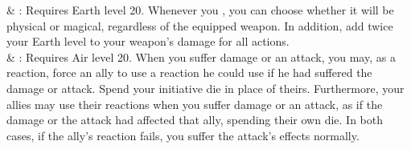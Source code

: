 \begin{tabjob}
     & %
    : Requires Earth level 20. Whenever you , you can choose whether it will be physical or magical, regardless of the equipped weapon. In addition, add twice your Earth level to your weapon's damage for all actions. \\
     & %
    : Requires Air level 20. When you suffer damage or an attack, you may, as a reaction, force an ally to use a reaction he could use if he had suffered the damage or attack. Spend your initiative die in place of theirs. Furthermore, your allies may use their reactions when you suffer damage or an attack, as if the damage or the attack had affected that ally, spending their own die. In both cases, if the ally's reaction fails, you suffer the attack's effects normally. \\
\end{tabjob}